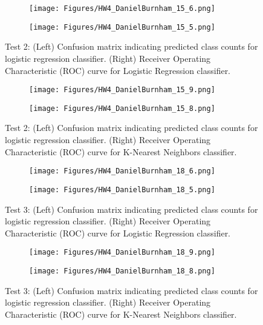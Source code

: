 \documentclass{article}
\begin{document}
\begin{appendices}
\begin{figure}
\centering
   \begin{subfigure}{0.49\linewidth} \centering
     \texttt{[image: Figures/HW4\_DanielBurnham\_15\_6.png]}
   \end{subfigure}
   \begin{subfigure}{0.49\linewidth} \centering
     \texttt{[image: Figures/HW4\_DanielBurnham\_15\_5.png]}
   \end{subfigure}
\caption{Test 2: (Left) Confusion matrix indicating predicted class counts for logistic regression classifier. (Right) Receiver Operating Characteristic (ROC) curve for Logistic Regression classifier.} \label{fig:LRtest2}
\end{figure}
\newpage

\begin{figure}[h]
\centering
   \begin{subfigure}{0.49\linewidth} \centering
     \texttt{[image: Figures/HW4\_DanielBurnham\_15\_9.png]}
   \end{subfigure}
   \begin{subfigure}{0.49\linewidth} \centering
     \texttt{[image: Figures/HW4\_DanielBurnham\_15\_8.png]}
   \end{subfigure}
\caption{Test 2: (Left) Confusion matrix indicating predicted class counts for logistic regression classifier. (Right) Receiver Operating Characteristic (ROC) curve for K-Nearest Neighbors classifier.} \label{fig:KNtest2}
\end{figure}

\begin{figure}[h]
\centering
   \begin{subfigure}{0.49\linewidth} \centering
     \texttt{[image: Figures/HW4\_DanielBurnham\_18\_6.png]}
   \end{subfigure}
   \begin{subfigure}{0.49\linewidth} \centering
     \texttt{[image: Figures/HW4\_DanielBurnham\_18\_5.png]}
   \end{subfigure}
\caption{Test 3: (Left) Confusion matrix indicating predicted class counts for logistic regression classifier. (Right) Receiver Operating Characteristic (ROC) curve for Logistic Regression classifier.} \label{fig:LRtest3}
\end{figure}

\begin{figure}[h]
\centering
   \begin{subfigure}{0.49\linewidth} \centering
     \texttt{[image: Figures/HW4\_DanielBurnham\_18\_9.png]}
   \end{subfigure}
   \begin{subfigure}{0.49\linewidth} \centering
     \texttt{[image: Figures/HW4\_DanielBurnham\_18\_8.png]}
   \end{subfigure}
\caption{Test 3: (Left) Confusion matrix indicating predicted class counts for logistic regression classifier. (Right) Receiver Operating Characteristic (ROC) curve for K-Nearest Neighbors classifier.} \label{fig:KNtest3}
\end{figure}
\label{appendix:figures}


\end{appendices}
\end{document}
